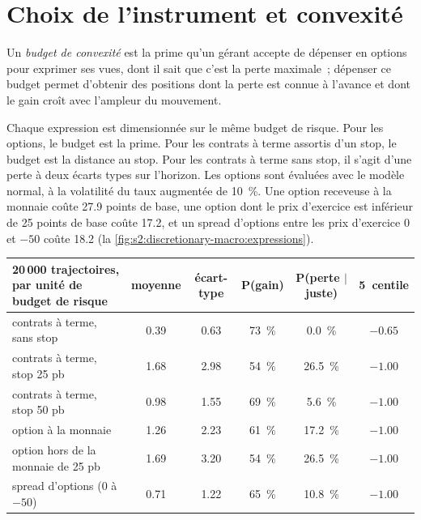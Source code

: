 \section{Choix de l'instrument et convexité}

\begin{definition}\label{def:s2:discretionary-macro:convexity}
Un \emph{budget de convexité} est la prime qu'un gérant accepte de dépenser en options pour exprimer ses vues, dont il sait que c'est la perte maximale~;
dépenser ce budget permet d'obtenir des positions dont la perte est connue à l'avance et dont le gain croît avec l'ampleur du mouvement.
\end{definition}

Chaque expression est dimensionnée sur le même budget de risque. Pour les options, le budget est la prime. Pour les contrats à terme assortis d'un stop, le budget est la distance au stop. Pour les contrats à terme
sans stop, il s'agit d'une perte à deux écarts types sur l'horizon. Les options sont évaluées avec le modèle normal, à la volatilité du taux augmentée de 10~\%. Une
option receveuse à la monnaie coûte 27.9 points de base, une option dont le prix d'exercice est inférieur de 25 points de base coûte 17.2, et un spread d'options entre les prix d'exercice 0 et
$-50$ coûte 18.2 (la \cref{fig:s2:discretionary-macro:expressions}).

\begin{center}
\small
\setlength{\tabcolsep}{4pt}%
\begin{tabular}{@{}p{4.4cm}ccccc@{}}
\toprule
20\,000 trajectoires, par unité de budget de risque & moyenne & écart-type & P(gain) & P(perte $|$ juste) & 5\up{e}~centile\\
\midrule
contrats à terme, sans stop & 0.39 & 0.63 & 73~\% & 0.0~\% & $-0.65$\\
contrats à terme, stop 25 pb & 1.68 & 2.98 & 54~\% & 26.5~\% & $-1.00$\\
contrats à terme, stop 50 pb & 0.98 & 1.55 & 69~\% & 5.6~\% & $-1.00$\\
option à la monnaie & 1.26 & 2.23 & 61~\% & 17.2~\% & $-1.00$\\
option hors de la monnaie de 25 pb & 1.69 & 3.20 & 54~\% & 26.5~\% & $-1.00$\\
spread d'options (0 à $-50$) & 0.71 & 1.22 & 65~\% & 10.8~\% & $-1.00$\\
\bottomrule
\end{tabular}
\end{center}

